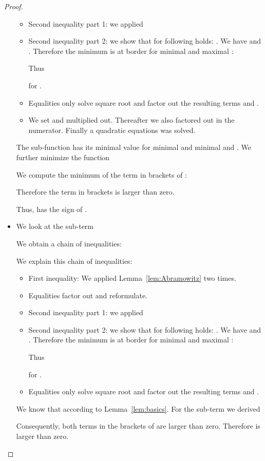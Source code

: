 \documentclass{article}
\begin{document}
\begin{proof}
\begin{itemize}
\begin{itemize}
\item Second inequality part 1: we applied

\item Second inequality part 2: we show that for  following holds:
. 
We have  and
 . 
Therefore the minimum is at border for minimal  and maximal :

Thus

for .

\item Equalities only solve square root and factor out the resulting
  terms  and .

\item We set  and multiplied out. Thereafter we
  also factored out  in the numerator. Finally a quadratic
  equations was solved. 
\end{itemize}

The sub-function has its minimal value for 
minimal  and minimal 
 and . 
We further minimize the function



We compute the minimum of the term in brackets of :  

Therefore the term in brackets is larger than zero.

Thus, 
has the sign of .


\item 

We look at the sub-term

We obtain a chain of inequalities:

We explain this chain of inequalities:
\begin{itemize}
\item First inequality: We applied Lemma~\ref{lem:Abramowitz} two times.

\item Equalities factor out  and reformulate.

\item Second inequality part 1: we applied

\item Second inequality part 2: we show that for  following holds:
. 
We have  and
 . 
Therefore the minimum is at border for minimal  and maximal :

Thus

for .

\item Equalities only solve square root and factor out the resulting
  terms  and .
\end{itemize}

We know that  according to 
Lemma~\ref{lem:basics}.
For the sub-term we derived  


Consequently, both terms in the brackets of  
are larger than zero.
Therefore  
is larger than zero.
\end{itemize}

\end{proof}
\end{document}
